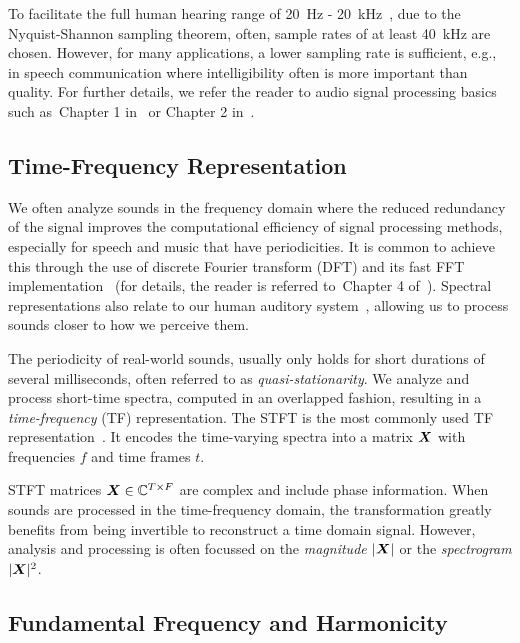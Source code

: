To facilitate the full human hearing range of 20~\si{\hertz} - 20~\si{\kilo\hertz}~\cite{moore89, zwicker13}, due to the Nyquist-Shannon sampling theorem, often, sample rates of at least 40~\si{\kilo\hertz} are chosen.
However, for many applications, a lower sampling rate is sufficient, e.g., in speech communication where intelligibility often is more important than quality.
For further details, we refer the reader to audio signal processing basics such as~Chapter 1 in~\cite{proakis96} or Chapter 2 in~\cite{Mueller15}.

\hypertarget{time-frequency-representation}{%
\subsection{Time-Frequency Representation}\label{sub:time-frequency-representation}}

We often analyze sounds in the frequency domain where the reduced redundancy of the signal improves the computational efficiency of signal processing methods, especially for speech and music that have periodicities.
It is common to achieve this through the use of discrete Fourier transform (DFT) and its fast FFT implementation~\cite{cooley65} (for details, the reader is referred to~Chapter 4 of~\cite{proakis96}).
Spectral representations also relate to our human auditory system~\cite{zwicker13, moore89}, allowing us to process sounds closer to how we perceive them.
\par
The periodicity of real-world sounds, usually only holds for short durations of several milliseconds, often referred to as \emph{quasi-stationarity}.
We analyze and process short-time spectra, computed in an overlapped fashion, resulting in a \emph{time-frequency} (TF) representation.
The \ac{STFT} is the most commonly used TF representation~\cite{mcaulay86}.
It encodes the time-varying spectra into a matrix \({\bm{X}}\) with frequencies \(f\) and time frames \(t\).
\par
\acs{STFT} matrices \({\bm{X}} \in {\mathbb{C}}^{T \times F}\) are complex and include phase information.
When sounds are processed in the time-frequency domain, the transformation greatly benefits from being invertible to reconstruct a time domain signal.
However, analysis and processing is often focussed  on the \emph{magnitude} \(|{\bm{X}}|\) or the \emph{spectrogram} \(|{\bm{X}}|^2\).

\subsection{Fundamental Frequency and Harmonicity}


